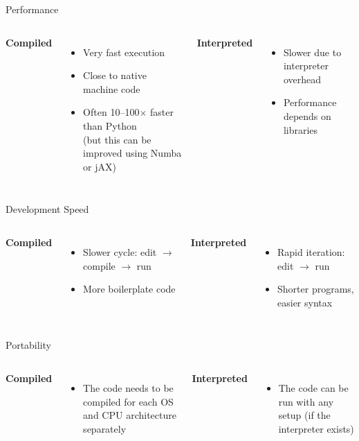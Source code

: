\begin{frame}{Performance}
	\begin{columns}[T]
		\textbf{Compiled}
		\begin{itemize}
			\item Very fast execution
			\item Close to native machine code
			\item Often 10--100$\times$ faster than Python \\ (but this can be improved using Numba or jAX)
		\end{itemize}
		
		\textbf{Interpreted}
		\begin{itemize}
			\item Slower due to interpreter overhead
			\item Performance depends on libraries
		\end{itemize}
	\end{columns}
\end{frame}


\begin{frame}{Development Speed}
	\begin{columns}[T]
		\textbf{Compiled}
		\begin{itemize}
			\item Slower cycle: edit $\to$ compile $\to$ run
			\item More boilerplate code
		\end{itemize}
		
		\textbf{Interpreted}
		\begin{itemize}
			\item Rapid iteration: edit $\to$ run
			\item Shorter programs, easier syntax
		\end{itemize}
	\end{columns}
\end{frame}

\begin{frame}{Portability}
	\begin{columns}[T]
		\textbf{Compiled}
		\begin{itemize}
			\item The code needs to be compiled for each OS and CPU architecture separately
		\end{itemize}
		
		\textbf{Interpreted}
		\begin{itemize}
			\item The code can be run with any setup (if the interpreter exists)
		\end{itemize}
	\end{columns}
\end{frame}


